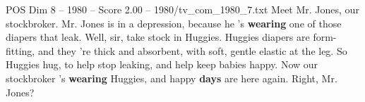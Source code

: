 \begin{textsample}{POS Dim 8 – 1980 – Score 2.00 – 1980/tv\_com\_1980\_7.txt}  \label{ex:f8_pos_041}
Meet Mr.
Jones, our stockbroker.
Mr.
Jones is in a depression, because he 's \textbf{wearing} one of those diapers that leak.
Well, sir, take stock in Huggies.
Huggies diapers are form-fitting, and they 're thick and absorbent, with soft, gentle elastic at the leg.
So Huggies hug, to help stop leaking, and help keep babies happy.
Now our stockbroker 's \textbf{wearing} Huggies, and happy \textbf{days} are here again.
Right, Mr.
Jones?

\end{textsample}
